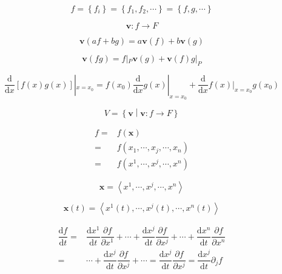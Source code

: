 \documentclass[
]{book}
\theoremstyle{definition}
\theoremstyle{definition}
\theoremstyle{definition}
\theoremstyle{definition}
\theoremstyle{remark}
\begin{document}
\[
f=\left\{ f_{{\scriptscriptstyle i}}\right\} =\left\{ f_{{\scriptscriptstyle 1}},f_{{\scriptscriptstyle 2}},\cdots\right\} =\left\{ f,g,\cdots\right\} 
\]

\[
\boldsymbol{v}:f\rightarrow F
\]

\[
\boldsymbol{v}\left(af+bg\right)=a\boldsymbol{v}\left(f\right)+b\boldsymbol{v}\left(g\right)
\]

\[
\boldsymbol{v}\left(fg\right)=f|_{{\scriptscriptstyle P}}\boldsymbol{v}\left(g\right)+\boldsymbol{v}\left(f\right)g|_{{\scriptscriptstyle P}}
\]

\[
\dfrac{\mathrm{d}}{\mathrm{d}x}\left[f\left(x\right)g\left(x\right)\right]|_{x=x_{{\scriptscriptstyle 0}}}=f\left(x_{{\scriptscriptstyle 0}}\right)\dfrac{\mathrm{d}}{\mathrm{d}x}g\left(x\right)|_{x=x_{{\scriptscriptstyle 0}}}+\dfrac{\mathrm{d}}{\mathrm{d}x}f\left(x\right)|_{x=x_{{\scriptscriptstyle 0}}}g\left(x_{{\scriptscriptstyle 0}}\right)
\]

\[
V=\left\{ \boldsymbol{v}\middle|\boldsymbol{v}:f\rightarrow F\right\} 
\]

\[
\begin{aligned}
f= & f\left(\boldsymbol{x}\right)\\
= & f\left(x_{{\scriptscriptstyle 1}},\cdots,x_{{\scriptscriptstyle j}},\cdots,x_{{\scriptscriptstyle n}}\right)\\
= & f\left(x^{{\scriptscriptstyle 1}},\cdots,x^{{\scriptscriptstyle j}},\cdots,x^{{\scriptscriptstyle n}}\right)
\end{aligned}
\]

\[
\boldsymbol{x}=\left\langle x^{{\scriptscriptstyle 1}},\cdots,x^{{\scriptscriptstyle j}},\cdots,x^{{\scriptscriptstyle n}}\right\rangle 
\]

\[
\boldsymbol{x}\left(t\right)=\left\langle x^{{\scriptscriptstyle 1}}\left(t\right),\cdots,x^{{\scriptscriptstyle j}}\left(t\right),\cdots,x^{{\scriptscriptstyle n}}\left(t\right)\right\rangle 
\]

\[
\begin{aligned}
\dfrac{\mathrm{d}f}{\mathrm{d}t}= & \dfrac{\mathrm{d}x^{{\scriptscriptstyle 1}}}{\mathrm{d}t}\dfrac{\partial f}{\partial x^{{\scriptscriptstyle 1}}}+\cdots+\dfrac{\mathrm{d}x^{{\scriptscriptstyle j}}}{\mathrm{d}t}\dfrac{\partial f}{\partial x^{{\scriptscriptstyle j}}}+\cdots+\dfrac{\mathrm{d}x^{{\scriptscriptstyle n}}}{\mathrm{d}t}\dfrac{\partial f}{\partial x^{{\scriptscriptstyle n}}}\\
= & \cdots+\dfrac{\mathrm{d}x^{{\scriptscriptstyle j}}}{\mathrm{d}t}\dfrac{\partial f}{\partial x^{{\scriptscriptstyle j}}}+\cdots=\dfrac{\mathrm{d}x^{{\scriptscriptstyle j}}}{\mathrm{d}t}\dfrac{\partial f}{\partial x^{{\scriptscriptstyle j}}}=\dfrac{\mathrm{d}x^{{\scriptscriptstyle j}}}{\mathrm{d}t}\partial_{{\scriptscriptstyle j}}f
\end{aligned}
\]
\end{document}
